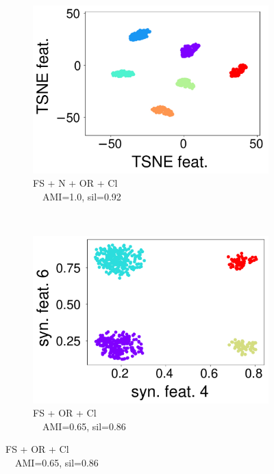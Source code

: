 \begin{figure}[t]
    \begin{subfigure}[t]{0.31\columnwidth}
        \centering
        \includegraphics[scale=.15]{chapters/data-centric/unsupervised/img/ft_sc_ou_cl.pdf}
        \caption{FS + N + OR + Cl\\$\quad$AMI=1.0, sil=0.92}
        \label{clustering-fig:d1}
    \end{subfigure}
    ~~
    \begin{subfigure}[t]{0.31\columnwidth}
        \centering
        \includegraphics[scale=.15]{chapters/data-centric/unsupervised/img/dashboard_1_pred.pdf}
        \caption{FS + OR + Cl\\$\quad$AMI=0.65, sil=0.86}
        \label{clustering-fig:d3}
    \end{subfigure}

\end{figure}
